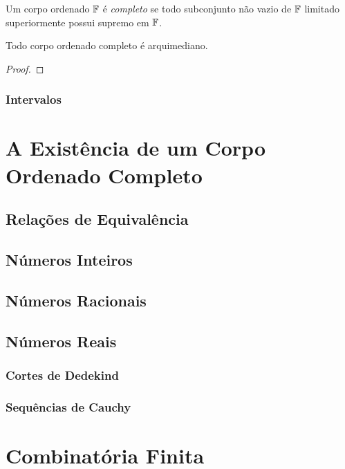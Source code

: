 \begin{definition}
    Um corpo ordenado $\mathbb{F}$ é \emph{completo} se todo subconjunto não vazio de $\mathbb{F}$ limitado superiormente possui supremo em $\mathbb{F}$.
\end{definition}

\begin{proposition}
    Todo corpo ordenado completo é arquimediano.
\end{proposition}

\begin{proof}
    
\end{proof}

\subsubsection{Intervalos}

\section{A Existência de um Corpo Ordenado Completo}

\subsection{Relações de Equivalência}

\subsection{Números Inteiros}

\subsection{Números Racionais}

\subsection{Números Reais}

\subsubsection{Cortes de Dedekind}

\subsubsection{Sequências de Cauchy}

\section{Combinatória Finita}

